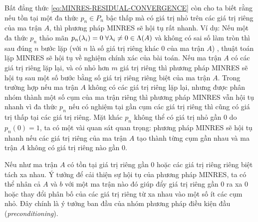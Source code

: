 \documentclass[14pt, a4paper]{article}
\numberwithin{equation}{section}
\numberwithin{algorithm}{section}
\numberwithin{figure}{section}
\numberwithin{dl}{section}
\numberwithin{md}{section}
\numberwithin{bd}{section}
\numberwithin{dn}{section}
\numberwithin{hq}{section}
\begin{document}
\begin{enumerate}[a)]
    Bất đẳng thức \ref{eq:MINRES-RESIDUAL-CONVERGENCE} còn cho ta biết rằng nếu tồn tại một đa thức $p_n \in P_n$ bậc thấp mà có giá trị nhỏ trên các giá trị riêng của ma trận $A$, thì phương pháp MINRES sẽ hội tụ rất nhanh. Ví dụ: Nếu một đa thức $p_n$ thảo mãn $p_n(\lambda_i)=0  \thickspace \forall \lambda_i \neq 0 \in \Lambda(A)$ và không có sai số làm tròn thì sau đúng $n$ bước lặp (với $n$ là số giá trị riêng khác 0 của ma trận $A$) , thuật toán lặp MINRES sẽ hội tụ về nghiệm chính xác của bài toán.
    Nếu ma trận $A$ có các giá trị riêng lặp lại, và có nhỏ hơn $m$ giá trị riêng thì phương pháp MINRES sẽ hội tụ sau một số bước bằng số giá trị riêng riêng biệt của ma trận $A$. Trong trường hợp nếu ma trận $A$ không có các giá trị riêng lặp lại, nhưng được phân nhóm thành một số cụm của ma trận riêng thì phương pháp MINRES vẫn hội tụ nhanh vì đa thức $p_n$ nếu có nghiệm tại gần cụm các giá trị riêng thì cũng có giá trị thấp tại các giá trị riêng.
    Mặt khác $p_n$ không thể có giá trị nhỏ gần $0$ do $p_n(0)=1$, ta có một vài quan sát quan trọng: phương pháp MINRES sẽ hội tụ nhanh nếu các giá trị riêng của ma trận $A$ tạo thành từng cụm gần nhau và ma trận $A$ không có giá trị riêng nào gần 0.

    Nếu như ma trận $A$ có tồn tại giá trị riêng gần 0 hoặc các giá trị riêng riêng biệt tách xa nhau. Ý tưởng để cải thiện sự hội tụ của phương pháp MINRES, ta có thể nhân cả $A$ và $b$ với một ma trận nào đó giúp đẩy giá trị riêng gần 0 ra xa 0 hoặc thay đổi phân bố của các giá trị riêng từ xa nhau vào một số ít các cụm nhỏ. Đây chính là ý tưởng ban đầu của nhóm phương pháp điều kiện đầu (\textit{preconditioning}).


\end{enumerate}
\end{document}
